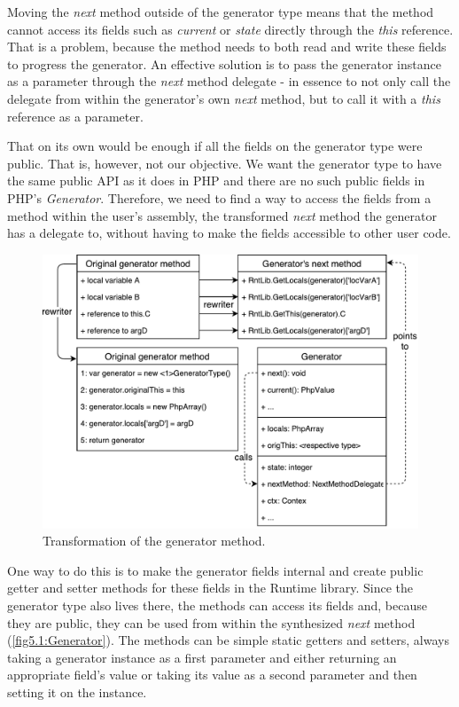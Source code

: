 Moving the \emph{next} method outside of the generator type means that the method cannot access its fields such as \emph{current} or \emph{state} directly through the \emph{this} reference. That is a problem, because the method needs to both read and write these fields to progress the generator. An effective solution is to pass the generator instance as a parameter through the \emph{next} method delegate - in essence to not only call the delegate from within the generator’s own \emph{next} method, but to call it with a \emph{this} reference as a parameter.

That on its own would be enough if all the fields on the generator type were public. That is, however, not our objective. We want the generator type to have the same public API as it does in PHP and there are no such public fields in PHP’s \emph{Generator}. Therefore, we need to find a way to access the fields from a method within the user’s assembly, the transformed \emph{next} method the generator has a delegate to, without having to make the fields accessible to other user code.

\begin{figure}[H]
	\centering	
	\includegraphics[scale=0.70]{../img/5_1_Generator}	
	\caption{Transformation of the generator method.}
	\label{fig5.1:Generator}
\end{figure}

One way to do this is to make the generator fields internal and create public getter and setter methods for these fields in the Runtime library. Since the generator type also lives there, the methods can access its fields and, because they are public, they can be used from within the synthesized \emph{next} method (\autoref{fig5.1:Generator}). The methods can be simple static getters and setters, always taking a generator instance as a first parameter and either returning an appropriate field’s value or taking its value as a second parameter and then setting it on the instance.

